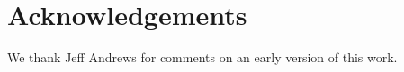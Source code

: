 \documentclass[modern]{aastex631}
\newcommand{\todo}[1]{\textcolor{red}{TODO: #1}}
\begin{document}

\label{sec:conclusion}
\section{Acknowledgements}
\begin{acknowledgments}
    We thank Jeff Andrews for comments on an early version of this work.
\end{acknowledgments}


\clearpage


\end{document}
